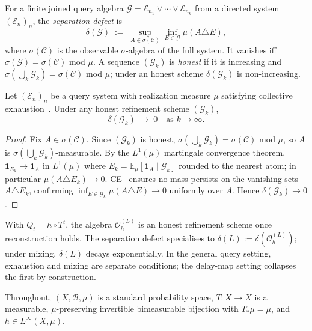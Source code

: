 For a finite joined query algebra $\mathcal{G} = \mathcal{E}_{n_1} \vee \cdots
\vee \mathcal{E}_{n_k}$ from a directed system $(\mathcal{E}_n)_n$, the
\emph{separation defect} is
\[
  \delta(\mathcal{G})
  \;:=\;
  \sup_{A \in \sigma(\mathcal{C})} \inf_{E \in \mathcal{G}} \mu(A \triangle E),
\]
where $\sigma(\mathcal{C})$ is the observable $\sigma$-algebra of the full
system.  It vanishes iff $\sigma(\mathcal{G}) = \sigma(\mathcal{C})$ mod $\mu$.
A sequence $(\mathcal{G}_k)$ is \emph{honest} if it is increasing and
$\sigma(\bigcup_k \mathcal{G}_k) = \sigma(\mathcal{C})$ mod $\mu$; under an
honest scheme $\delta(\mathcal{G}_k)$ is non-increasing.

\begin{theorem}
\label{II:thm:ce-sep-defect}
Let $(\mathcal{E}_n)_n$ be a query system with realization measure $\mu$
satisfying collective exhaustion~\cite{mahon_paper1}.  Under any honest
refinement scheme $(\mathcal{G}_k)$,
\[
  \delta(\mathcal{G}_k) \;\longrightarrow\; 0
  \quad \text{as } k \to \infty.
\]
\end{theorem}

\begin{proof}
Fix $A \in \sigma(\mathcal{C})$.  Since $(\mathcal{G}_k)$ is honest,
$\sigma(\bigcup_k \mathcal{G}_k) = \sigma(\mathcal{C})$ mod $\mu$, so $A$
is $\sigma(\bigcup_k \mathcal{G}_k)$-measurable.  By the $L^1(\mu)$
martingale convergence theorem, $\mathbf{1}_{E_k} \to \mathbf{1}_A$ in
$L^1(\mu)$ where $E_k = \mathbb{E}_\mu[\mathbf{1}_A \mid \mathcal{G}_k]$
rounded to the nearest atom; in particular $\mu(A \triangle E_k) \to 0$.
CE~\cite{mahon_paper1} ensures no mass persists on the vanishing sets
$A \triangle E_k$, confirming $\inf_{E \in \mathcal{G}_k}\mu(A \triangle E)
\to 0$ uniformly over $A$.  Hence $\delta(\mathcal{G}_k) \to 0$.
\end{proof}

\begin{remark}
\label{II:rem:temporal-spec}
With $Q_t = h \circ T^t$, the algebra $\mathcal{O}_h^{(L)}$ is an honest
refinement scheme once reconstruction holds.
The separation defect specialises to $\delta(L) := \delta(\mathcal{O}_h^{(L)})$;
under mixing, $\delta(L)$ decays exponentially.  In the general
query setting, exhaustion and mixing are separate conditions; the delay-map
setting collapses the first by construction.
\end{remark}


Throughout, $(X, \mathcal{B}, \mu)$ is a standard
probability space, $T : X \to X$ is a measurable, $\mu$-preserving invertible
bimeasurable bijection with $T_*\mu = \mu$, and $h \in L^\infty(X, \mu)$.

